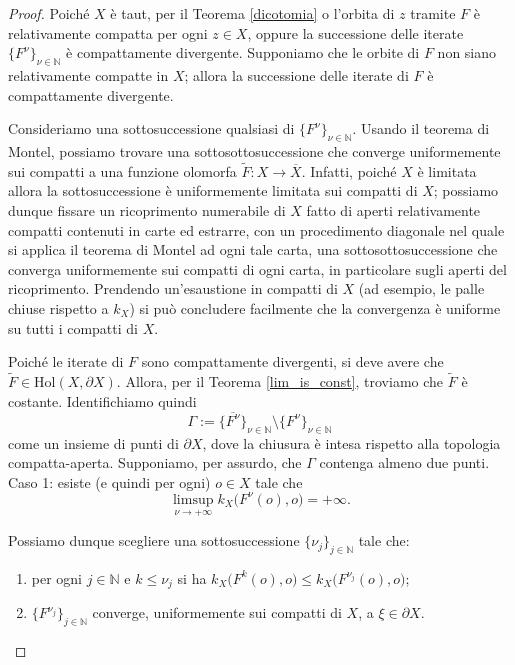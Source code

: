 \begin{proof}
    Poiché $X$ è taut, per il Teorema \ref{dicotomia} o l'orbita di $z$ tramite $F$ è relativamente compatta per ogni $z \in X$, oppure la successione delle iterate $\{F^\nu\}_{\nu\in\mathbb{N}}$ è compattamente divergente. Supponiamo che le orbite di $F$ non siano relativamente compatte in $X$; allora la successione delle iterate di $F$ è compattamente divergente.

    Consideriamo una sottosuccessione qualsiasi di $\{F^\nu\}_{\nu\in\mathbb{N}}$. Usando il teorema di Montel, possiamo trovare una sottosottosuccessione che converge uniformemente sui compatti a una funzione olomorfa $\tilde{F}:X \rightarrow \overline{X}$. Infatti, poiché $X$ è limitata allora la sottosuccessione è uniformemente limitata sui compatti di $X$; possiamo dunque fissare un ricoprimento numerabile di $X$ fatto di aperti relativamente compatti contenuti in carte ed estrarre, con un procedimento diagonale nel quale si applica il teorema di Montel ad ogni tale carta, una sottosottosuccessione che converga uniformemente sui compatti di ogni carta, in particolare sugli aperti del ricoprimento. Prendendo un'esaustione in compatti di $X$ (ad esempio, le palle chiuse rispetto a $k_X$) si può concludere facilmente che la convergenza è uniforme su tutti i compatti di $X$.

    Poiché le iterate di $F$ sono compattamente divergenti, si deve avere che $\tilde{F}\in\text{Hol}(X,\partial X)$. Allora, per il Teorema \ref{lim_is_const}, troviamo che $\tilde{F}$ è costante. Identifichiamo quindi
    $$\Gamma:=\overline{\{F^\nu\}}_{\nu\in\mathbb{N}}\setminus\{F^\nu\}_{\nu\in\mathbb{N}}$$
    come un insieme di punti di $\partial X$, dove la chiusura è intesa rispetto alla topologia compatta-aperta. Supponiamo, per assurdo, che $\Gamma$ contenga almeno due punti. \\

    Caso 1: esiste (e quindi per ogni) $o \in X$ tale che
    $$\limsup_{\nu\longrightarrow+\infty} k_X\big(F^\nu(o),o\big)=+\infty.$$

    Possiamo dunque scegliere una sottosuccessione $\{\nu_j\}_{j\in\mathbb{N}}$ tale che:
    \begin{enumerate}[label={(\arabic*)}]
        \item per ogni $j\in\mathbb{N}$ e $k\le\nu_j$ si ha $k_X\big(F^k(o),o\big) \le k_X\big(F^{\nu_j}(o),o\big)$;
        \item $\{F^{\nu_j}\}_{j\in\mathbb{N}}$ converge, uniformemente sui compatti di $X$, a $\xi\in\partial X$.
    \end{enumerate}


\end{proof}
